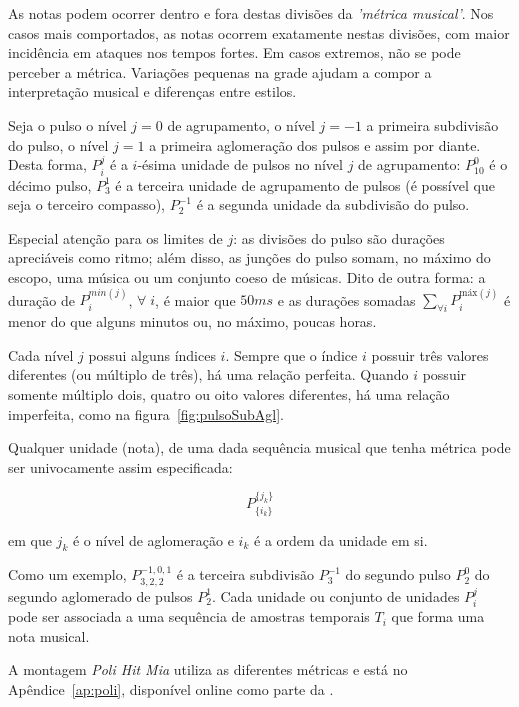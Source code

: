 As notas podem ocorrer dentro e fora destas divisões da \emph{'métrica musical'}. Nos casos mais comportados, as notas ocorrem exatamente nestas divisões, com maior incidência em ataques nos tempos fortes.
Em casos extremos, não se pode perceber a métrica.\cite{Roederer} Variações pequenas na grade ajudam a compor a interpretação musical e diferenças entre estilos.\cite{Cook}

Seja o pulso o nível $j=0$ de agrupamento, o nível $j=-1$ 
a primeira subdivisão do pulso, o nível $j=1$ a primeira aglomeração dos pulsos e assim por diante. 
Desta forma, $P_i^j$ é a $i$-ésima unidade de 
pulsos no nível $j$ de agrupamento:
$P^0_{10}$ é o décimo pulso, $P^{1}_3$ é a terceira unidade de agrupamento de pulsos (é possível que seja o terceiro compasso),
$P^{-1}_2$ é a segunda unidade da subdivisão do pulso.

Especial atenção para
os limites de $j$: as divisões do pulso são durações apreciáveis
como ritmo; além disso, as junções do pulso somam, no máximo
do escopo, uma música ou um conjunto coeso de músicas. Dito de outra forma: a duração de $P^{min(j)}_i$, $\forall \; i$,
é maior que $50ms$ e as durações somadas $\sum_{\forall i}P^{\text{máx}(j)}_i$
é menor do que alguns minutos ou, no máximo, poucas horas.


Cada nível $j$ possui alguns índices $i$. Sempre que o índice $i$ possuir três valores diferentes
(ou múltiplo de três), há uma relação perfeita. 
Quando $i$ possuir somente múltiplo dois, quatro ou oito valores diferentes, há uma relação imperfeita, como na figura~\ref{fig:pulsoSubAgl}.


Qualquer unidade (nota), de uma
dada sequência musical que tenha métrica pode ser
univocamente assim especificada:

\begin{equation}
P^{ \{ j_k \} }_{ \{ i_{k} \}}
\end{equation}

em que $j_k$ é o nível de aglomeração e $i_k$ é a ordem
da unidade em si.

Como um exemplo, $P^{-1,0,1}_{3,2,2}$  é a terceira subdivisão $P^{-1}_3$ do segundo
pulso $P^0_2$ do segundo aglomerado de pulsos $P^1_2$.
Cada unidade ou conjunto de unidades $P_i^j$ pode ser associada a uma sequência de amostras temporais $T_i$ que forma uma nota musical. 

A montagem \emph{Poli Hit Mia} utiliza as diferentes métricas e está no Apêndice~\ref{ap:poli}, disponível online como parte da \massa.

